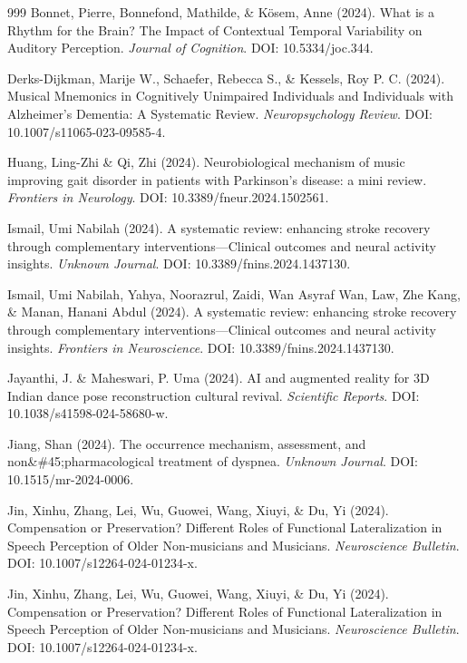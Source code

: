 \documentclass[9pt,onecolumn]{article}
\begin{document}
\begin{thebibliography}{999}
Bonnet, Pierre, Bonnefond, Mathilde, \& Kösem, Anne (2024). What is a Rhythm for the Brain? The Impact of Contextual Temporal Variability on Auditory Perception. \textit{Journal of Cognition}. DOI: 10.5334/joc.344.

Derks-Dijkman, Marije W., Schaefer, Rebecca S., \& Kessels, Roy P. C. (2024). Musical Mnemonics in Cognitively Unimpaired Individuals and Individuals with Alzheimer's Dementia: A Systematic Review. \textit{Neuropsychology Review}. DOI: 10.1007/s11065-023-09585-4.

Huang, Ling-Zhi \& Qi, Zhi (2024). Neurobiological mechanism of music improving gait disorder in patients with Parkinson's disease: a mini review. \textit{Frontiers in Neurology}. DOI: 10.3389/fneur.2024.1502561.

Ismail, Umi Nabilah (2024). A systematic review: enhancing stroke recovery through complementary interventions—Clinical outcomes and neural activity insights. \textit{Unknown Journal}. DOI: 10.3389/fnins.2024.1437130.

Ismail, Umi Nabilah, Yahya, Noorazrul, Zaidi, Wan Asyraf Wan, Law, Zhe Kang, \& Manan, Hanani Abdul (2024). A systematic review: enhancing stroke recovery through complementary interventions—Clinical outcomes and neural activity insights. \textit{Frontiers in Neuroscience}. DOI: 10.3389/fnins.2024.1437130.

Jayanthi, J. \& Maheswari, P. Uma (2024). AI and augmented reality for 3D Indian dance pose reconstruction cultural revival. \textit{Scientific Reports}. DOI: 10.1038/s41598-024-58680-w.

Jiang, Shan (2024). The occurrence mechanism, assessment, and non\&\#45;pharmacological treatment of dyspnea. \textit{Unknown Journal}. DOI: 10.1515/mr-2024-0006.

Jin, Xinhu, Zhang, Lei, Wu, Guowei, Wang, Xiuyi, \& Du, Yi (2024). Compensation or Preservation? Different Roles of Functional Lateralization in Speech Perception of Older Non-musicians and Musicians. \textit{Neuroscience Bulletin}. DOI: 10.1007/s12264-024-01234-x.

Jin, Xinhu, Zhang, Lei, Wu, Guowei, Wang, Xiuyi, \& Du, Yi (2024). Compensation or Preservation? Different Roles of Functional Lateralization in Speech Perception of Older Non-musicians and Musicians. \textit{Neuroscience Bulletin}. DOI: 10.1007/s12264-024-01234-x.


\end{thebibliography}
\end{document}
